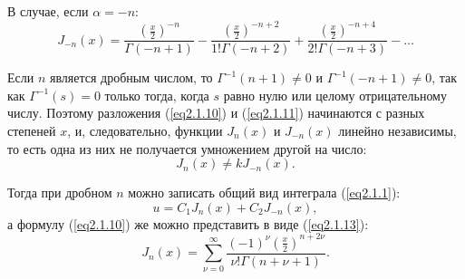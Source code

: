     В случае, если \( \alpha = -n \):
    \begin{equation}
        J_{-n}(x) = \frac{\left(\frac{x}{2}\right)^{-n}}{\Gamma(-n+1)} - \frac{\left(\frac{x}{2}\right)^{-n+2}}{1!\Gamma(-n+2)} + \frac{\left(\frac{x}{2}\right)^{-n+4}}{2!\Gamma(-n+3)} - \ldots
        \label{eq2.1.11}
    \end{equation}
    
    Если \( n \) является дробным числом, то \( \Gamma^{-1}(n+1) \ne 0 \) и \( \Gamma^{-1}(-n+1) \ne 0 \), так как \( \Gamma^{-1}(s) = 0 \) только тогда, когда \( s \) равно нулю или целому отрицательному числу. Поэтому разложения (\ref{eq2.1.10}) и (\ref{eq2.1.11}) начинаются с разных степеней \( x \), и, следовательно, функции \( J_n(x) \) и \( J_{-n}(x) \) линейно независимы, то есть одна из них не получается умножением другой на число:
    \[ J_n(x) \ne kJ_{-n}(x). \]
    
    Тогда при дробном \( n \) можно записать общий вид интеграла (\ref{eq2.1.1}):
    \begin{equation}
        u = C_1J_n(x) + C_2J_{-n}(x),
        \label{eq2.1.12}
    \end{equation}
    а формулу (\ref{eq2.1.10}) же можно представить в виде (\ref{eq2.1.13}):
    \begin{equation}
        J_n(x) = \sum\limits_{\nu = 0}^\infty \frac{(-1)^\nu \left(\frac{x}{2}\right)^{n+2\nu}}{\nu!\Gamma(n + \nu + 1)}.
        \label{eq2.1.13}
    \end{equation}
